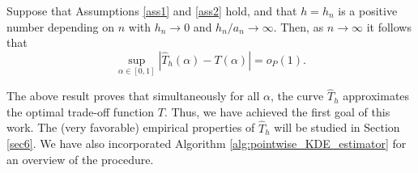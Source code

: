 \begin{theo} \label{theo:1}
    Suppose that Assumptions \ref{ass1} and \ref{ass2} hold, and that $h=h_n$ is a positive number depending on $n$ with $h_n \to 0$ and $h_n/a_n \to \infty$. Then, as $n \to \infty$ it follows that
    \[
    \sup_{\alpha \in [0,1]}|\hat T_h(\alpha)-T(\alpha)|=o_P(1).
    \]
\end{theo}
The above result proves that simultaneously for all $\alpha$, the curve $\hat T_h$ approximates the optimal trade-off function $T$. Thus, we have achieved the first goal of this work. The (very favorable) empirical properties of $\hat T_h$ will be studied in Section \ref{sec6}. We have also incorporated Algorithm \ref{alg:pointwise_KDE_estimator} for an overview of the procedure. 


